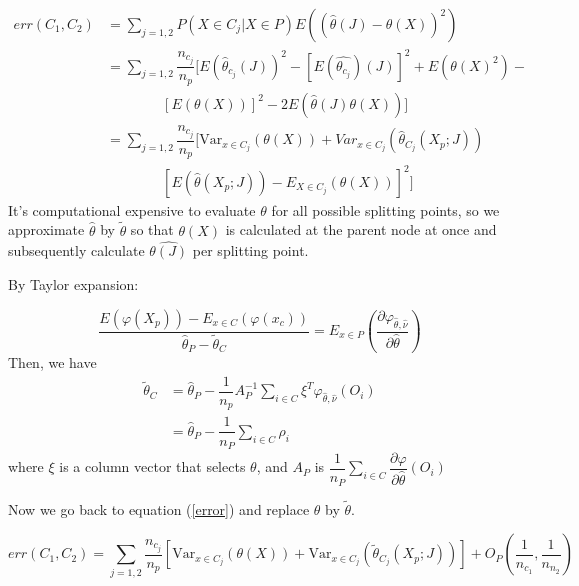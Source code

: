 \documentclass[12pt,letterpaper]{article}
\newcommand{\var}{\mathrm{Var }}
\begin{document}
\begin{equation}
	\begin{aligned}\label{error} 
		err(C_1, C_2)  & = \sum_{j=1,2}P(X \in C_{j} | X \in P) E( (\hat{\theta}(J) - \theta(X))^2) \\
		& = \sum_{j=1,2} \dfrac{n_{c_j}}{n_p}[E(\hat{\theta}_{c_j}(J))^2 - [E(\hat{\theta_{c_j}})(J)]^2 + E(\theta(X)^2) - \\
		 & \qquad \qquad [E(\theta(X))]^2 -  2E(\hat{\theta}(J)\theta(X)) ] \\
		 & = \sum_{j=1,2} \dfrac{n_{c_j}}{n_{p}} [\var_{x \in C_j} (\theta(X)) + Var_{x \in C_{j}}(\hat{\theta}_{C_j}(X_{p};J))  \\ 
		 & \qquad \qquad [ E(\hat{\theta}(X_{p};J)) - E_{X\in C_{j}}(\theta(X)) ]^2  ]
	\end{aligned} 
\end{equation}
It's computational expensive to evaluate $ \theta $ for all possible splitting points, so we approximate $ \hat{\theta} $ by $ \tilde{\theta} $ so that  $ \theta(X) $ is calculated at the parent node at once and subsequently calculate $ \hat{\theta(J)} $ per splitting point. 

By Taylor expansion:

\begin{equation}\label{key}
	\dfrac{E(\varphi(X_p)) - E_{x \in C}(\varphi(x_c))}{\hat{\theta}_P - \tilde{\theta}_C} = E_{x\in P}(\dfrac{\partial \varphi_{\hat{\theta}, \hat \nu}}{\partial \hat{\theta}})
\end{equation}
Then, we have 
\begin{equation}
	\begin{aligned}\label{approximation}
		\tilde{\theta}_C & = \hat{\theta}_{P} - \dfrac{1}{n_{p}} A_{P}^{-1} \sum\limits_{i \in C} \xi^T \varphi_{\hat{\theta}, \hat{\nu}}(O_{i}) \\
		& = \hat{\theta}_{P} - \dfrac{1}{n_P} \sum_{i\in C} \rho_{i}
	\end{aligned}
\end{equation}
where $ \xi $ is a column vector that selects $ \theta $, and  $ A_P $ is $ \dfrac{1}{n_P}   \sum\limits_{i \in C} \dfrac{\partial \varphi}{\partial  \hat{\theta}}(O_i) $


Now we go back to equation (\ref{error}) and replace $ \theta $ by $ \tilde{\theta} $. 

\begin{equation}\label{key}
	err(C_1, C_2) = \sum_{j=1,2} \dfrac{n_{c_j}}{n_{p}} [\var_{x \in C_j} (\theta(X)) + \var_{x \in C_{j}}(\tilde{\theta}_{C_j}(X_{p};J))]  + O_P(\dfrac{1}{n_{c_1}}, \dfrac{1}{n_{n_2}})
\end{equation}
\end{document}
